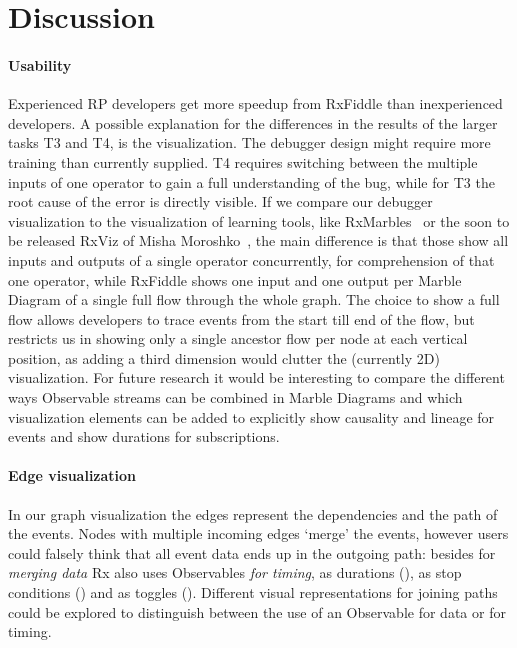\section{Discussion}

\paragraph{Usability}
Experienced RP developers get more speedup from RxFiddle than inexperienced developers. A possible explanation for the differences in the results of the larger tasks T3 and T4, is the visualization. The debugger design might require more training than currently supplied. T4 requires switching between the multiple inputs of one operator to gain a full understanding of the bug, while for T3 the root cause of the error is directly visible. If we compare our debugger visualization to the visualization of learning tools, like RxMarbles~\cite{rxmarbles} or the soon to be released RxViz of Misha Moroshko~\cite{rxviz}, the main difference is that those show all inputs and outputs of a single operator concurrently, for comprehension of that one operator, while RxFiddle shows one input and one output per Marble Diagram of a single full flow through the whole graph. The choice to show a full flow allows developers to trace events from the start till end of the flow, but restricts us in showing only a single ancestor flow per node at each vertical position, as adding a third dimension would clutter the (currently 2D) visualization. For future research it would be interesting to compare the different ways Observable streams can be combined in Marble Diagrams and which visualization elements can be added to explicitly show causality and lineage for events and show durations for subscriptions.

\paragraph{Edge visualization}
In our graph visualization the edges represent the dependencies and the path of the events. Nodes with multiple incoming edges `merge' the events, however users could falsely think that all event data ends up in the outgoing path: besides for \textit{merging data} Rx also uses Observables \textit{for timing}, as durations (), as stop conditions () and as toggles (). Different visual representations for joining paths could be explored to distinguish between the use of an Observable for data or for timing.
